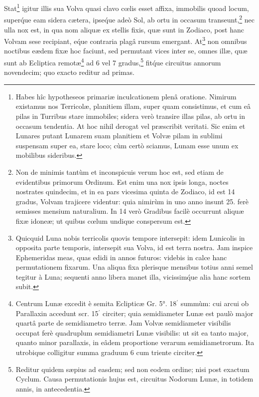 \documentclass[a4paper, 11pt, oneside, polutonikogreek, german]{article}
\begin{document}
Stat\footnote{Habes hîc hypotheseos primariæ inculcationem plenâ oratione. Nimirum existamus nos Terricolæ, planitiem illam, super quam consistimus, et cum eâ pilas in Turribus stare immobiles; sidera verò transire illas pilas, ab ortu in occasum tendentia. At hoc nihil derogat vel præscribit veritati. Sic enim et Lunares putant Lunarem suam planitiem et Volvæ pilam in sublimi suspensam super ea, stare loco; cùm certò sciamus, Lunam esse unum ex mobilibus sideribus.} igitur illis sua Volva quasi clavo cœlis esset affixa, immobilis quoad locum, super\'que eam sidera cætera, ipse\'que adeò Sol, ab ortu in occasum transeunt,\footnote{Non de minimis tantùm et inconspicuis verum hoc est, sed etiam de evidentibus primorum Ordinum. Est enim una nox ipsis longa, noctes nostrates quindecim, et in ea pars vicesima quinta de Zodiaco, id est 14 gradus, Volvam trajicere videntur: quia nimirùm in uno anno insunt 25. ferè semisses mensium naturalium. In 14 verò Gradibus facilè occurrunt aliquæ fixæ idoneæ; ut quibus cœlum undique conspersum est.} nec ulla nox est, in qua nom aliquæ ex stellis fixis, quæ sunt in Zodiaco, post hanc Volvam sese recipiant, e\'que contraria plagâ rursum emergant. At\footnote{Quicquid Luna nobis terricolis quovis tempore intersepit: idem Lunicolis in opposita parte temporis, intersepit sua Volva, id est terra nostra. Jam inspice Ephemeridas meas, quas edidi in annos futuros: videbis in calce hanc permutationem fixarum. Una aliqua fixa plerisque mensibus totius anni semel tegitur à Luna; sequenti anno libera manet illa, vicissim\'que alia hanc sortem subit.} non omnibus noctibus eædem fixæ hoc faciunt, sed permutant vices inter se, omnes illæ, quæ sunt ab Ecliptica remotæ\footnote{Centrum Lunæ excedit è semita Eclipticæ Gr. 5°. 18$^{\prime}$ summùm: cui arcui ob Parallaxin accedunt scr. 15$^{\prime}$ circiter; quia semidiameter Lunæ est paulò major quartâ parte de semidiametro terræ. Jam Volvæ semidiameter visibilis occupat ferè quadruplum semidiametri Lunæ visibilis: ut sit ea tanto major, quanto minor parallaxis, in eâdem proportione verarum semidiametrorum. Ita utrobique colligitur summa graduum 6 cum triente circiter.} ad 6 vel 7 gradus,\footnote{Reditur quidem sæpius ad easdem; sed non eodem ordine; nisi post exactum Cyclum. Causa permutationis hujus est, circuitus Nodorum Lunæ, in totidem annis, in antecedentia.} fit\'que circuitus annorum novendecim; quo exacto reditur ad primas.
\end{document}
